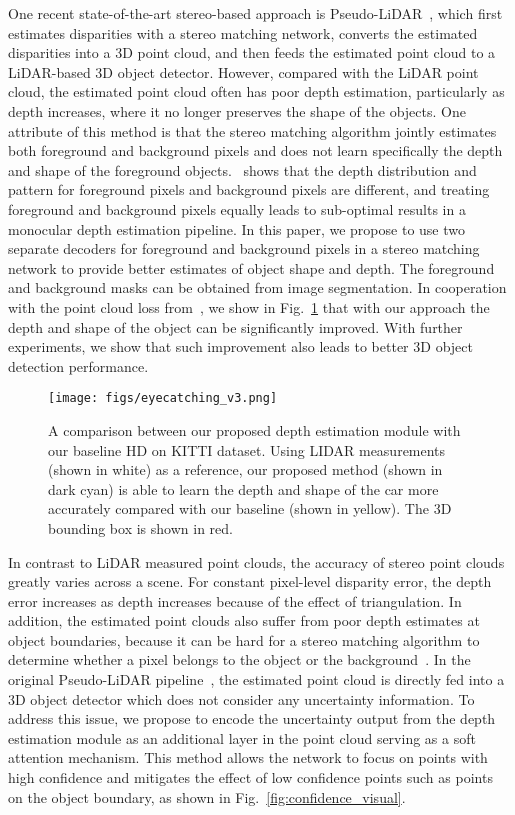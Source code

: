 \documentclass[letterpaper, 10 pt, conference]{ieeeconf}
\begin{document}
One recent state-of-the-art stereo-based approach is Pseudo-LiDAR~\cite{wang2019pseudo, you2019pseudo}, which first estimates disparities with a stereo matching network, converts the estimated disparities into a 3D point cloud, and then feeds the estimated point cloud to a LiDAR-based 3D object detector. However, compared with the LiDAR point cloud, the estimated point cloud often has poor depth estimation, particularly as depth increases, where it no longer preserves the shape of the objects. One attribute of this method is that the stereo matching algorithm jointly estimates both foreground and background pixels and does not learn specifically the depth and shape of the foreground objects.~\cite{wang2019task} shows that the depth distribution and pattern for foreground pixels and background pixels are different, and treating foreground and background pixels equally leads to sub-optimal results in a monocular depth estimation pipeline. In this paper, we propose to use two separate decoders for foreground and background pixels in a stereo matching network to provide better estimates of object shape and depth. The foreground and background masks can be obtained from image segmentation. In cooperation with the point cloud loss from~\cite{ku2019monocular}, we show in Fig.~\ref{fig:estimated_pc} that with our approach the depth and shape of the object can be significantly improved. With further experiments, we show that such improvement also leads to better 3D object detection performance. 

\begin{figure}[t] 
	\begin{center}
		\texttt{[image: figs/eyecatching\_v3.png]}
	\end{center}
		\caption{A comparison between our proposed depth estimation module with our baseline HD on KITTI dataset. Using LIDAR measurements (shown in white) as a reference, our proposed method (shown in dark cyan) is able to learn the depth and shape of the car more accurately compared with our baseline (shown in yellow). The 3D bounding box is shown in red.}
		\label{fig:estimated_pc}
\end{figure}

In contrast to LiDAR measured point clouds, the accuracy of stereo point clouds greatly varies across a scene. For constant pixel-level disparity error, the depth error increases as depth increases because of the effect of triangulation. In addition, the estimated point clouds also suffer from poor depth estimates at object boundaries, because it can be hard for a stereo matching algorithm to determine whether a pixel belongs to the object or the background~\cite{pon2019object}. In the original Pseudo-LiDAR pipeline~\cite{wang2019pseudo, you2019pseudo}, the estimated point cloud is directly fed into a 3D object detector which does not consider any uncertainty information. To address this issue, we propose to encode the uncertainty output from the depth estimation module as an additional layer in the point cloud serving as a soft attention mechanism.  This method allows the network to focus on points with high confidence and mitigates the effect of low confidence points such as points on the object boundary, as shown in Fig.~\ref{fig:confidence_visual}. 
\end{document}
